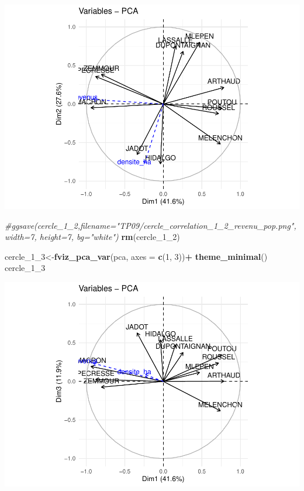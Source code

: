 \documentclass[
]{book}
\newenvironment{Shaded}{\begin{snugshade}}{\end{snugshade}}
\newcommand{\AttributeTok}[1]{\textcolor[rgb]{0.13,0.29,0.53}{#1}}
\newcommand{\CommentTok}[1]{\textcolor[rgb]{0.56,0.35,0.01}{\textit{#1}}}
\newcommand{\DecValTok}[1]{\textcolor[rgb]{0.00,0.00,0.81}{#1}}
\newcommand{\FunctionTok}[1]{\textcolor[rgb]{0.13,0.29,0.53}{\textbf{#1}}}
\newcommand{\NormalTok}[1]{#1}
\newcommand{\OtherTok}[1]{\textcolor[rgb]{0.56,0.35,0.01}{#1}}
\newcommand{\SpecialCharTok}[1]{\textcolor[rgb]{0.81,0.36,0.00}{\textbf{#1}}}
\begin{document}
\includegraphics{manuel_geo_quanti_files/figure-latex/unnamed-chunk-85-1.pdf}

\begin{Shaded}
\begin{Highlighting}[]
\CommentTok{\#ggsave(cercle\_1\_2,filename="TP09/cercle\_correlation\_1\_2\_revenu\_pop.png", width=7, height=7, bg="white")}
\FunctionTok{rm}\NormalTok{(cercle\_1\_2)}


\NormalTok{cercle\_1\_3}\OtherTok{\textless{}{-}}\FunctionTok{fviz\_pca\_var}\NormalTok{(pca,  }\AttributeTok{axes =} \FunctionTok{c}\NormalTok{(}\DecValTok{1}\NormalTok{, }\DecValTok{3}\NormalTok{))}\SpecialCharTok{+}
  \FunctionTok{theme\_minimal}\NormalTok{()}
\NormalTok{cercle\_1\_3}
\end{Highlighting}
\end{Shaded}

\includegraphics{manuel_geo_quanti_files/figure-latex/unnamed-chunk-85-2.pdf}
\end{document}
